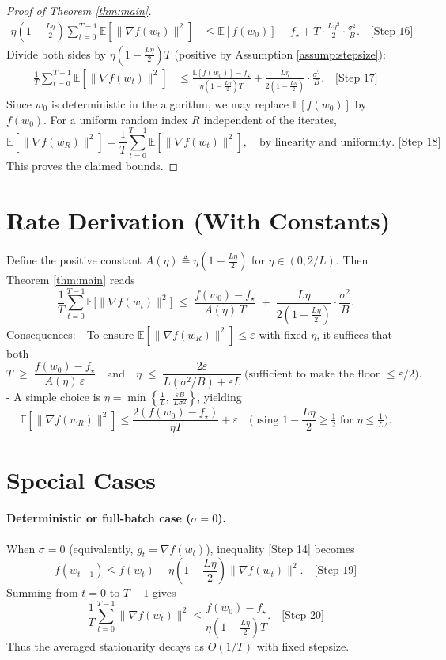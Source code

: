 \documentclass[11pt]{article}
\newcommand{\E}{\mathbb{E}}
\begin{document}
\begin{proof}[Proof of Theorem \ref{thm:main}]
\begin{align*}
\eta\!\left(1-\frac{L\eta}{2}\right)\!\sum_{t=0}^{T-1}\E[\|\nabla f(w_t)\|^2]
&\le \E[f(w_0)] - f_\star + T\cdot \frac{L\eta^2}{2}\cdot \frac{\sigma^2}{B}. \quad \text{[Step 16]}
\end{align*}
Divide both sides by $\eta\left(1-\frac{L\eta}{2}\right)T$ (positive by Assumption \ref{assump:stepsize}):
\begin{align*}
\frac{1}{T}\sum_{t=0}^{T-1}\E[\|\nabla f(w_t)\|^2]
&\le \frac{\E[f(w_0)] - f_\star}{\eta\left(1-\frac{L\eta}{2}\right)T}
+ \frac{L\eta}{2\left(1-\frac{L\eta}{2}\right)}\cdot \frac{\sigma^2}{B}. \quad \text{[Step 17]}
\end{align*}
Since $w_0$ is deterministic in the algorithm, we may replace $\E[f(w_0)]$ by $f(w_0)$. For a uniform random index $R$ independent of the iterates,
\[
\E[\|\nabla f(w_R)\|^2] = \frac{1}{T}\sum_{t=0}^{T-1}\E[\|\nabla f(w_t)\|^2], \quad \text{by linearity and uniformity. \ [Step 18]}
\]
This proves the claimed bounds.
\end{proof}

\section*{Rate Derivation (With Constants)}
Define the positive constant $A(\eta)\triangleq \eta\left(1-\frac{L\eta}{2}\right)$ for $\eta\in(0,2/L)$. Then Theorem \ref{thm:main} reads
\[
\frac{1}{T}\sum_{t=0}^{T-1}\E\big[\|\nabla f(w_t)\|^2\big]
\;\le\;
\frac{f(w_0)-f_\star}{A(\eta)\,T}
\;+\;
\frac{L\eta}{2\left(1-\frac{L\eta}{2}\right)}\cdot \frac{\sigma^2}{B}.
\]
Consequences:
- To ensure $\E[\|\nabla f(w_R)\|^2]\le \varepsilon$ with fixed $\eta$, it suffices that both
  \[
  T \;\ge\; \frac{f(w_0)-f_\star}{A(\eta)\,\varepsilon}
  \quad\text{and}\quad
  \eta \;\le\; \frac{2\varepsilon}{L(\sigma^2/B)+\varepsilon L}\ \text{(sufficient to make the floor $\le \varepsilon/2$).}
  \]
- A simple choice is $\eta = \min\left\{\frac{1}{L},\, \frac{\varepsilon B}{L\sigma^2}\right\}$, yielding
  \[
  \E[\|\nabla f(w_R)\|^2] \le \frac{2(f(w_0)-f_\star)}{\eta T} + \varepsilon \quad \text{(using $1-\frac{L\eta}{2}\ge \tfrac{1}{2}$ for $\eta\le \tfrac{1}{L}$).}
  \]

\section*{Special Cases}
\paragraph{Deterministic or full-batch case ($\sigma=0$).}
When $\sigma=0$ (equivalently, $g_t=\nabla f(w_t)$), inequality [Step 14] becomes
\[
f(w_{t+1}) \le f(w_t) - \eta\!\left(1-\frac{L\eta}{2}\right)\!\|\nabla f(w_t)\|^2. \quad \text{[Step 19]}
\]
Summing from $t=0$ to $T-1$ gives
\[
\frac{1}{T}\sum_{t=0}^{T-1}\|\nabla f(w_t)\|^2 \le \frac{f(w_0)-f_\star}{\eta\left(1-\frac{L\eta}{2}\right)T}. \quad \text{[Step 20]}
\]
Thus the averaged stationarity decays as $O(1/T)$ with fixed stepsize.
\end{document}
